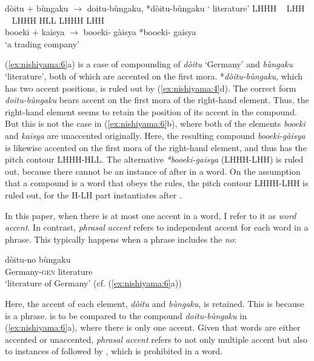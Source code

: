 \documentclass[output=paper]{LSP/langsci}
\begin{document}
\ea\label{ex:nishiyama:6}
 \ea  dòitu +  bùngaku $\to$ doitu-bùngaku, *dòitu-bùngaku
 \glt ‘ literature’
  \ex 
  \gll LHHH ~ LHH   ~ LHHH HLL     LHHH LHH\\
    booeki + kaisya $\to$ booeki- gàisya   *booeki- gaisya\\
\glt ‘a trading company’
\z
\z

(\ref{ex:nishiyama:6}a) is a case of compounding of \textit{dòitu} ‘Germany’ and \textit{bùngaku} ‘literature’, both of which are accented on the first mora. *\textit{dòitu-bùngaku}, which has two accent positions, is ruled out by (\ref{ex:nishiyama:4}d). The correct form \textit{doitu-bùngaku} bears accent on the first mora of the right-hand element. Thus, the right-hand element seems to retain the position of its accent in the compound. But this is not the case in (\ref{ex:nishiyama:6}b), where both of the elements \textit{booeki} and \textit{kaisya} are unaccented originally. Here, the resulting compound \textit{booeki-gàisya} is likewise accented on the first mora of the right-hand element, and thus has the pitch contour LHHH-HLL. The alternative \textit{*booeki-gaisya} (LHHH-LHH) is ruled out, because there cannot be an instance of  after  in a word. On the assumption that a compound is a word that obeys the  rules, the pitch contour LHHH-LHH is ruled out, for the H-LH part instantiates  after .

In this paper, when there is at most one accent in a word, I refer to it as \textit{word accent}. In contrast, \textit{phrasal accent} refers to independent accent for each word in a phrase. This typically happens when a phrase includes the  \textit{no}:

\ea\label{ex:nishiyama:7}
\gll dòitu-no      bùngaku  \\
  Germany-\textsc{gen}  literature\\
 \glt ‘literature of Germany’     (cf. (\ref{ex:nishiyama:6}a))
\z

Here, the accent of each element, \textit{dòitu} and \textit{bùngaku}, is retained. This is because  is a phrase.  is to be compared to the compound \textit{doitu-bùngaku} in (\ref{ex:nishiyama:6}a), where there is only one accent. Given that words are either accented or unaccented, \textit{phrasal accent} refers to not only multiple accent but also to instances of  followed by , which is prohibited in a word.
\end{document}
